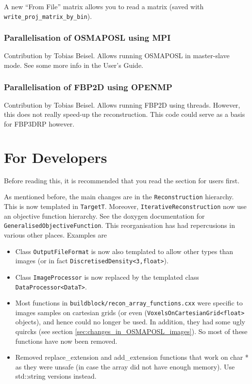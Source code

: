 \documentclass{article}
\begin{document}
A new ``From File'' matrix allows you to read a matrix (saved with \texttt{write\_proj\_matrix\_by\_bin}).

\subsubsection{Parallelisation of OSMAPOSL using MPI}
Contribution by Tobias Beisel. Allows running OSMAPOSL in master-slave mode.
See some more info in the User's Guide.
\subsubsection{Parallelisation of FBP2D using OPENMP}
Contribution by Tobias Beisel. Allows running FBP2D using threads.
However, this does not really speed-up the reconstruction. This code could
serve as a basis for FBP3DRP however.

\section{For Developers}

Before reading this, it is recommended that you read the section for
users first.

As mentioned before, the main changes are in the \texttt{Reconstruction}
hierarchy. This is now templated in \texttt{TargetT}. Moreover,
\texttt{IterativeReconstruction} now use an objective function hierarchy. See 
the doxygen documentation for \texttt{GeneralisedObjectiveFunction}. This
reorganisation has had repercusions in various other places. Examples are
\begin{itemize}
\item Class \texttt{OutputFileFormat} is now also templated to allow
other types than images (or in fact \texttt{DiscretisedDensity<3,float>}).
\item Class \texttt{ImageProcessor} is now replaced by the templated
class \texttt{DataProcessor<DataT>}.
\item Most functions in \texttt{buildblock/recon\_array\_functions.cxx}
were specific to images samples on cartesian grids 
(or even (\texttt{VoxelsOnCartesianGrid<float>} objects), and hence
could no longer be used. In addition, they had some ugly quircks
(see section \ref{sec:changes_in_OSMAPOSL_images}). So most of these
functions have now been removed.
\item Removed replace\_extension and add\_extension functions that work on char * as they were 
unsafe (in case the array did not have enough memory). Use std::string versions instead.

\end{itemize}
\end{document}
